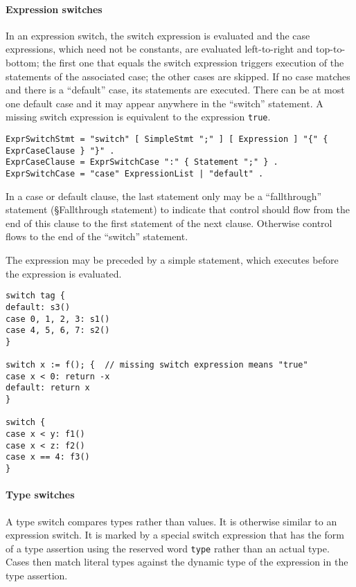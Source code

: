 {\paragraph{Expression switches}

In an expression switch, the switch expression is evaluated and the case
expressions, which need not be constants, are evaluated left-to-right
and top-to-bottom; the first one that equals the switch expression
triggers execution of the statements of the associated case; the other
cases are skipped. If no case matches and there is a ``default'' case,
its statements are executed. There can be at most one default case and
it may appear anywhere in the ``switch'' statement. A missing switch
expression is equivalent to the expression \texttt{true}.

\begin{Verbatim}[frame=single]
ExprSwitchStmt = "switch" [ SimpleStmt ";" ] [ Expression ] "{" { ExprCaseClause } "}" .
ExprCaseClause = ExprSwitchCase ":" { Statement ";" } .
ExprSwitchCase = "case" ExpressionList | "default" .
\end{Verbatim}

In a case or default clause, the last statement only may be a
``fallthrough'' statement
(§Fallthrough statement) to indicate
that control should flow from the end of this clause to the first
statement of the next clause. Otherwise control flows to the end of the
``switch'' statement.

The expression may be preceded by a simple statement, which executes
before the expression is evaluated.

\begin{Verbatim}[frame=single]
switch tag {
default: s3()
case 0, 1, 2, 3: s1()
case 4, 5, 6, 7: s2()
}

switch x := f(); {  // missing switch expression means "true"
case x < 0: return -x
default: return x
}

switch {
case x < y: f1()
case x < z: f2()
case x == 4: f3()
}
\end{Verbatim}

\paragraph{Type switches}

A type switch compares types rather than values. It is otherwise similar
to an expression switch. It is marked by a special switch expression
that has the form of a type assertion using
the reserved word \texttt{type} rather than an actual type. Cases then
match literal types against the dynamic type of the expression in the
type assertion.

}
